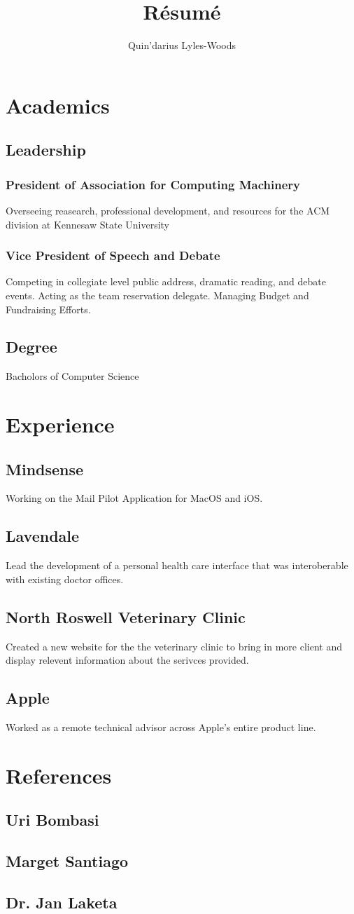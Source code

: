\documentclass{article}
\begin{document}
\title{R\'esum\'e}
\author{Quin'darius Lyles-Woods}
\maketitle

\section{Academics}
\subsection{Leadership}
\subsubsection{President of Association for Computing Machinery}
Overseeing reasearch, professional development, and resources for the ACM division at Kennesaw State University
\subsubsection{Vice President of Speech and Debate}
Competing in collegiate level public address, dramatic reading, and debate events.
Acting as the team reservation delegate.
Managing Budget and Fundraising Efforts.
\subsection{Degree}
Bacholors of Computer Science
\section{Experience}
\subsection{Mindsense}
Working on the Mail Pilot Application for MacOS and iOS.
\subsection{Lavendale}
Lead the development of a personal health care interface that was interoberable with existing doctor offices.
\subsection{North Roswell Veterinary Clinic}
Created a new website for the the veterinary clinic to bring in more client and display relevent information about the serivces provided.
\subsection{Apple}
Worked as a remote technical advisor across Apple's entire product line.
\section{References}
\subsection{Uri Bombasi}
\subsection{Marget Santiago}
\subsection{Dr. Jan Laketa}
\end{document}
